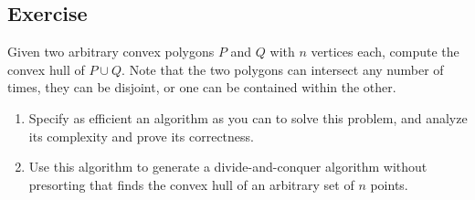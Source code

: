 \documentclass{article}
\newcounter{counter}
\newcommand{\Exercise}{Exercise \stepcounter{counter}\thecounter}
\begin{document}
  \subsection*{\Exercise}
    Given two arbitrary convex polygons $P$ and $Q$ with $n$ vertices each, compute the convex hull of $P \cup Q$. Note that the two polygons can intersect any number of times, they can be disjoint, or one can be contained within the other.
  \begin{enumerate}[label=(\alph*)]
    \item Specify as efficient an algorithm as you can to solve this problem,
      and analyze its complexity and prove its correctness.
    \item Use this algorithm to generate a divide-and-conquer algorithm
      without presorting that finds the convex hull of an arbitrary set of $n$
      points.
  \end{enumerate}
  
\end{document}
